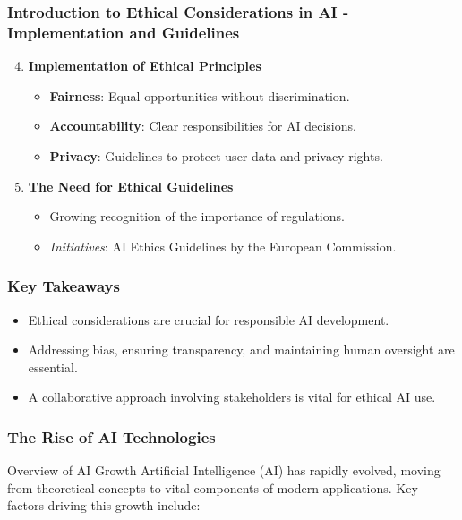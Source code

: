 \documentclass[aspectratio=169]{beamer}
\begin{document}
\begin{frame}[fragile]
    \frametitle{Introduction to Ethical Considerations in AI - Implementation and Guidelines}
    \begin{enumerate}
        \setcounter{enumi}{3}
        \item \textbf{Implementation of Ethical Principles}
        \begin{itemize}
            \item \textbf{Fairness}: Equal opportunities without discrimination.
            \item \textbf{Accountability}: Clear responsibilities for AI decisions.
            \item \textbf{Privacy}: Guidelines to protect user data and privacy rights.
        \end{itemize}
        
        \item \textbf{The Need for Ethical Guidelines}
        \begin{itemize}
            \item Growing recognition of the importance of regulations.
            \item \textit{Initiatives}: AI Ethics Guidelines by the European Commission.
        \end{itemize}
    \end{enumerate}
\end{frame}

\begin{frame}[fragile]
    \frametitle{Key Takeaways}
    \begin{itemize}
        \item Ethical considerations are crucial for responsible AI development.
        \item Addressing bias, ensuring transparency, and maintaining human oversight are essential.
        \item A collaborative approach involving stakeholders is vital for ethical AI use.
    \end{itemize}
\end{frame}

\begin{frame}[fragile]
    \frametitle{The Rise of AI Technologies}
    \begin{block}{Overview of AI Growth}
        Artificial Intelligence (AI) has rapidly evolved, moving from theoretical concepts to vital components of modern applications. Key factors driving this growth include:
    \end{block}
\end{frame}
\end{document}
